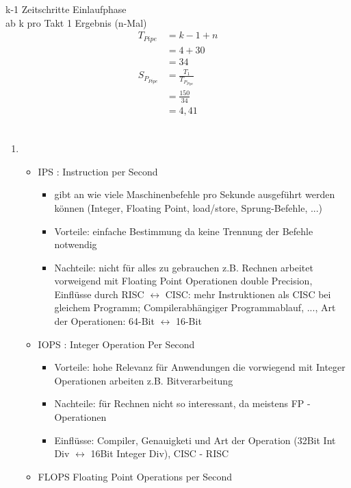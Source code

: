 \bigskip

k-1 Zeitschritte Einlaufphase \\
ab k pro Takt 1 Ergebnis (n-Mal)\\
\begin{align*}
	T_{Pipe} &= k-1 +n \\
	&= 4 + 30 \\
	&= 34 \\
	S_{P_{Pipe}} &= \frac{T_1}{T_{P_{Pipe}}}\\
	&= \frac{150}{34} \\
	&= 4,41 \\
\end{align*}
\subsection{}
\begin{enumerate}
	\item
	\begin{itemize}
		\item IPS : Instruction per Second
		\begin{itemize}
			\item gibt an wie viele Maschinenbefehle pro Sekunde ausgeführt werden können (Integer, Floating Point, load/store, Sprung-Befehle, ...)
			\item Vorteile: einfache Bestimmung da keine Trennung der Befehle notwendig
			\item Nachteile: nicht für alles zu gebrauchen z.B. Rechnen arbeitet vorweigend mit Floating Point Operationen double Precision, Einflüsse durch RISC \(\leftrightarrow\) CISC: mehr Instruktionen als CISC bei gleichem Programm; Compilerabhängiger Programmablauf, ..., Art der Operationen: 64-Bit \(\leftrightarrow\) 16-Bit
		\end{itemize}
		\item IOPS : Integer Operation Per Second
		\begin{itemize}
			\item Vorteile: hohe Relevanz für Anwendungen die vorwiegend mit Integer Operationen arbeiten z.B. Bitverarbeitung
			\item Nachteile: für Rechnen nicht so interessant, da meistens FP - Operationen
			\item Einflüsse: Compiler, Genauigketi und Art der Operation (32Bit Int Div \(\leftrightarrow\) 16Bit Integer Div), CISC - RISC
		\end{itemize}
		\item FLOPS Floating Point Operations per Second

\end{itemize}
\end{enumerate}
